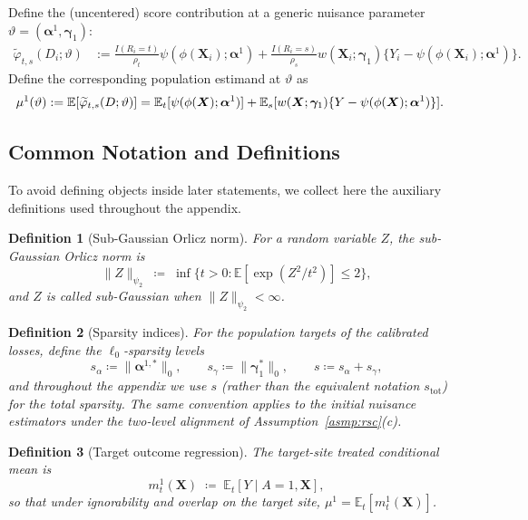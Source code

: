 \documentclass{article}
\newtheorem{definition}{Definition}[section]
\begin{document}
Define the (uncentered) score contribution at a generic nuisance parameter $\vartheta = (\boldsymbol{\alpha}^1, \boldsymbol{\gamma}_1)$:
\begin{align*}
\widetilde{\varphi}_{t,s}(D_i; \vartheta)
&:= \frac{I(R_i=t)}{\rho_t}\psi(\phi(\boldsymbol{X}_i); \boldsymbol{\alpha}^1)
+ \frac{I(R_i=s)}{\rho_s} w(\boldsymbol{X}_i;\boldsymbol{\gamma}_1)\{Y_i - \psi(\phi(\boldsymbol{X}_i); \boldsymbol{\alpha}^1)\}.
\end{align*}
Define the corresponding population estimand at $\vartheta$ as
\begin{align*}
\mu^1(\vartheta)
&:= \operatorname{\mathbb{E}}[\widetilde{\varphi}_{t,s}(D; \vartheta)]
= \operatorname{\mathbb{E}}_t[\psi(\phi(\boldsymbol{X}); \boldsymbol{\alpha}^1)]
+ \operatorname{\mathbb{E}}_s[w(\boldsymbol{X};\boldsymbol{\gamma}_1)\{Y - \psi(\phi(\boldsymbol{X}); \boldsymbol{\alpha}^1)\}].
\end{align*}


\subsection{Common Notation and Definitions}\label{sec:notation_defs}

To avoid defining objects inside later statements, we collect here the auxiliary definitions used throughout the appendix.

\begin{definition}[Sub-Gaussian Orlicz norm]\label{def:subgaussian}
For a random variable $Z$, the sub-Gaussian Orlicz norm is
\[
\|Z\|_{\psi_2}\;\coloneqq\;\inf\{t>0:\mathbb{E}[\exp(Z^2/t^2)]\le 2\},
\]
and $Z$ is called \emph{sub-Gaussian} when $\|Z\|_{\psi_2}<\infty$.
\end{definition}

\begin{definition}[Sparsity indices]\label{def:sparsity}
For the population targets of the calibrated losses, define the $\ell_0$-sparsity levels
\[
s_\alpha\coloneqq \|\boldsymbol{\alpha}^{1,*}\|_0,\qquad s_\gamma\coloneqq \|\boldsymbol{\gamma}_1^*\|_0,\qquad s\coloneqq s_\alpha+s_\gamma,
\]
and throughout the appendix we use $s$ (rather than the equivalent notation $s_{\mathrm{tot}}$) for the total sparsity. The same convention applies to the initial nuisance estimators under the two-level alignment of Assumption~\ref{asmp:rsc}(c).
\end{definition}

\begin{definition}[Target outcome regression]\label{def:mt1}
The target-site treated conditional mean is
\[
m_t^1(\boldsymbol{X})\;\coloneqq\;\mathbb{E}_t[Y\mid A=1,\boldsymbol{X}],
\]
so that under ignorability and overlap on the target site, $\mu^1=\mathbb{E}_t[m_t^1(\boldsymbol{X})]$.
\end{definition}
\end{document}
